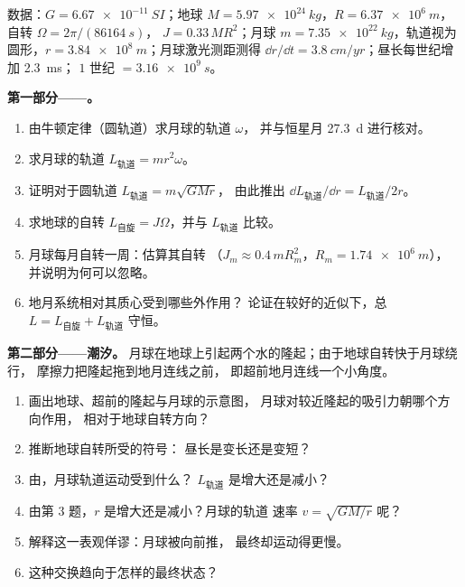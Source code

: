 \begin{problem}
\label{pb:b1:angular-momentum:1}
数据：$G = \qty{6.67e-11}{SI}$；地球 $M = \qty{5.97e24}{kg}$，$R =
\qty{6.37e6}{m}$，自转 $\Omega = 2\pi/(\qty{86164}{s})$，
$J = 0.33\,MR^2$；月球 $m = \qty{7.35e22}{kg}$，轨道视为
圆形，$r = \qty{3.84e8}{m}$；月球激光测距测得
$\dd r/\dd t = \qty{3.8}{cm/yr}$；昼长每世纪增加 \qty{2.3}{ms}；
$1$ 世纪 $= \qty{3.16e9}{s}$。

\medskip
\noindent\textbf{第一部分——。}
\begin{enumerate}
  \item 由牛顿定律（圆轨道）求月球的轨道 $\omega$，
        并与恒星月
        \qty{27.3}{d} 进行核对。
  \item 求月球的轨道 $L_{\text{轨道}} =
        mr^2\omega$。
  \item 证明对于圆轨道 $L_{\text{轨道}} = m\sqrt{GMr}$，
        由此推出 $\dd L_{\text{轨道}}/\dd r = L_{\text{轨道}}/2r$。
  \item 求地球的自转 $L_{\text{自旋}} =
        J\Omega$，并与 $L_{\text{轨道}}$ 比较。
  \item 月球每月自转一周：估算其自转
        （$J_m \approx 0.4\,mR_m^2$，$R_m = \qty{1.74e6}{m}$），
        并说明为何可以忽略。
  \item 地月系统相对其质心受到哪些外作用？
        论证在较好的近似下，总
        $L = L_{\text{自旋}} + L_{\text{轨道}}$ 守恒。
\end{enumerate}

\medskip
\noindent\textbf{第二部分——潮汐。}
月球在地球上引起两个水的隆起；由于地球自转快于月球绕行，
摩擦力把隆起拖到地月连线之前，
即超前地月连线一个小角度。
\begin{enumerate}[resume]
  \item 画出地球、超前的隆起与月球的示意图，
        月球对较近隆起的吸引力朝哪个方向作用，
        相对于地球自转方向？
  \item 推断地球自转所受的符号：
        昼长是变长还是变短？
  \item 由，月球轨道运动受到什么？
        $L_{\text{轨道}}$ 是增大还是减小？
  \item 由第 3 题，$r$ 是增大还是减小？月球的轨道
        速率 $v = \sqrt{GM/r}$ 呢？
  \item 解释这一表观佯谬：月球被向前推，
        最终却运动得更慢。
  \item 这种交换趋向于怎样的最终状态？
\end{enumerate}


\end{problem}
